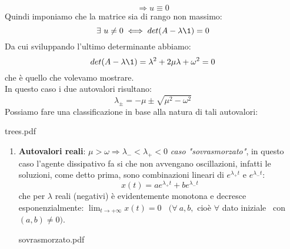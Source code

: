 \documentclass[Main.tex]{subfiles}
\begin{document}
\begin{tema}
 $$
 \Rightarrow u \equiv 0
 $$
Quindi imponiamo che la matrice sia di rango non massimo:
 $$\exists \ u \neq 0 \iff det(A- \lambda \1)=0$$
Da cui sviluppando l'ultimo determinante abbiamo:
 $$det(A-\lambda \1)= \lambda^2 + 2 \mu \lambda + \omega^2=0$$
che è quello che volevamo mostrare.\\
In questo caso i due autovalori risultano:
 $$
 \lambda_\pm = - \mu \pm \sqrt{\mu^2 -\omega^2}
 $$
 Possiamo fare una classificazione in base alla natura di tali autovalori:
  \begin{immagine}
 	{trees.pdf}{}
 \end{immagine}
 \begin{enumerate}
 	\item \textbf{Autovalori reali}: $\mu > \omega \Rightarrow \lambda_- < \lambda_+<0$ \textit{caso "sovrasmorzato"}, in questo caso l'agente dissipativo fa si che non avvengano oscillazioni, infatti le soluzioni, come detto prima, sono combinazioni lineari di $e^{\lambda_+ t}$ e $e^{\lambda_- t}$:
 	$$
x(t)= a e^{\lambda_+t} + b e^{\lambda_-t}
$$
che per $\lambda$ reali (negativi) è evidentemente monotona e decresce esponenzialmente:
$\lim_{t \rightarrow + \infty} x(t)=0 \ \ \ \ (\forall \ a,b,$ cioè $\forall$ dato iniziale \ con $(a,b) \neq 0 )$.
 \begin{immagine}
 	{sovrasmorzato.pdf}{}
 \end{immagine}
 



\end{enumerate}
\end{tema}
\end{document}
